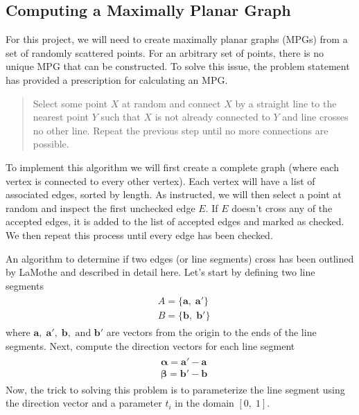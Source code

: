 \documentclass{article}
\newcommand{\ve}[1]{\boldsymbol{\mathbf{#1}}}
\begin{document}
\begin{multicols}{2}
\subsection{Computing a Maximally Planar Graph}
For this project, we will need to create maximally planar graphs (MPGs) from a set of randomly scattered points. For an arbitrary set of points, there is no unique MPG that can be constructed. To solve this issue, the problem statement has provided a prescription for calculating an MPG. 
\begin{quote}
Select some point $X$ at random and connect $X$ by a straight line
to the nearest point $Y$ such that $X$ is not already connected to $Y$ and line crosses no other line. Repeat the
previous step until no more connections are possible.
\end{quote}
To implement this algorithm we will first create a complete graph (where each vertex is connected to every other vertex). Each vertex will have a list of associated edges, sorted by length. As instructed, we will then select a point at random and inspect the first unchecked edge $E$. If $E$ doesn't cross any of the accepted edges, it is added to the list of accepted edges and marked as checked. We then repeat this process until every edge has been checked. \par
An algorithm to determine if two edges (or line segments) cross has been outlined by LaMothe \cite{tricks} and described in detail here. Let's start by defining two line segments 
\begin{align}
	\begin{split}
		& A = \{ \ve{a},\; \ve{a'} \} \\
		& B = \{\ve{b}, \;\ve{b'}\}
	\end{split}
\end{align}
where $\ve{a}, \; \ve{a'}, \; \ve{b}, \text{ and } \ve{b'}$ are vectors from the origin to the ends of the line segments. Next, compute the direction vectors for each line segment
\begin{align}
	\begin{split}
		&\ve{\alpha} = \ve{a}' - \ve{a} \\
		&\ve{\beta} = \ve{b}' - \ve{b} 
	\end{split}
\end{align}
Now, the trick to solving this problem is to parameterize the line segment using the direction vector and a parameter $t_i$ in the domain $[0, \; 1]$.
\begin{align}
	\begin{split}

\end{split}
\end{align}
\end{multicols}
\end{document}
